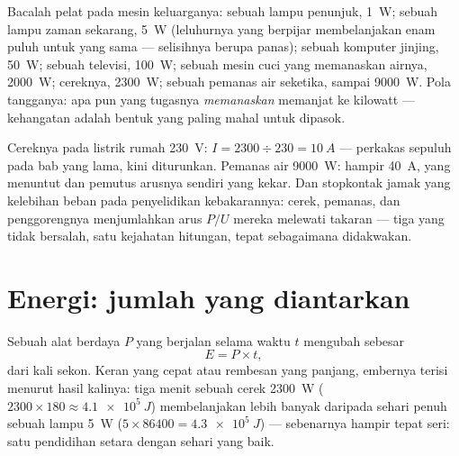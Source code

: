 \begin{example}\label{ex:g9:electric-power-energy:ladder}
Bacalah pelat pada mesin keluarganya: sebuah lampu penunjuk,
\qty{1}{W}; sebuah lampu zaman sekarang, \qty{5}{W} (leluhurnya yang
berpijar membelanjakan enam puluh untuk  yang sama ---
selisihnya berupa panas); sebuah komputer jinjing, \qty{50}{W}; sebuah
televisi, \qty{100}{W}; sebuah mesin cuci yang memanaskan airnya,
\qty{2000}{W}; cereknya, \qty{2300}{W}; sebuah pemanas air seketika,
sampai \qty{9000}{W}. Pola tangganya: apa pun yang tugasnya
\emph{memanaskan} memanjat ke kilowatt --- kehangatan adalah bentuk
 yang paling mahal untuk dipasok.
\end{example}

\begin{example}\label{ex:g9:electric-power-energy:fuses}
Cereknya pada listrik rumah \qty{230}{V}: $I = 2300 \div 230 =
\qty{10}{A}$ --- perkakas sepuluh  pada bab yang lama, kini
diturunkan. Pemanas air \qty{9000}{W}: hampir \qty{40}{A}, yang
menuntut  dan pemutus arusnya sendiri yang kekar. Dan stopkontak
jamak yang kelebihan beban pada penyelidikan kebakarannya: cerek,
pemanas, dan penggorengnya menjumlahkan arus $P/U$ mereka melewati
takaran  --- tiga yang tidak bersalah, satu kejahatan
hitungan, tepat sebagaimana didakwakan.
\end{example}

\section{Energi: jumlah yang diantarkan}

\begin{proposition}\label{prop:g9:electric-power-energy:Pt}
Sebuah alat berdaya $P$ yang berjalan selama waktu $t$ mengubah 
sebesar
\[
E = P \times t ,
\]
 dari  kali sekon. Keran yang cepat atau rembesan yang
panjang, embernya terisi menurut hasil kalinya: tiga menit sebuah
cerek \qty{2300}{W} ($2300 \times 180 \approx \qty{4.1e5}{J}$)
membelanjakan lebih banyak daripada sehari penuh sebuah lampu
\qty{5}{W} ($5 \times
86400 = \qty{4.3e5}{J}$) --- sebenarnya hampir tepat seri: satu
pendidihan setara dengan sehari  yang baik.
\end{proposition}

